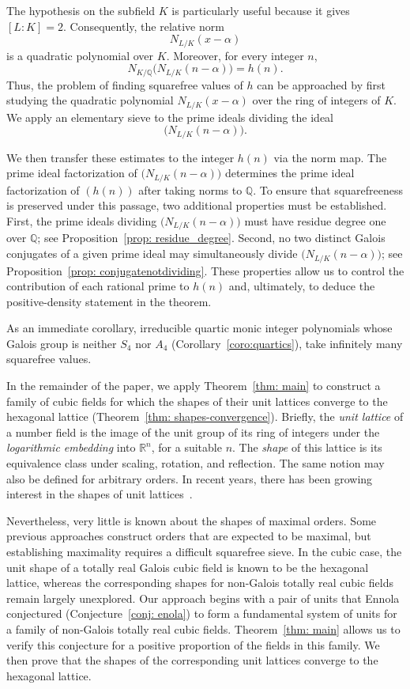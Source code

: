 \documentclass[11pt]{amsart}
\numberwithin{equation}{section}
\theoremstyle{definition}
\begin{document}
The hypothesis on the subfield $K$ is particularly useful because it gives $[L:K]=2$.
Consequently, the relative norm
\[
    N_{L/K}(x - \alpha)
\]
is a quadratic polynomial over $K$. Moreover, for every integer $n$,
\[
   N_{K/\mathbb{Q}}\bigl(N_{L/K}(n- \alpha)\bigr)=h(n).
\]
Thus, the problem of finding squarefree values of $h$ can be approached by first studying the quadratic polynomial $N_{L/K}(x-\alpha)$ over the ring of integers of $K$. We apply an elementary sieve to the prime ideals dividing the ideal
\[
   \bigl(N_{L/K}(n-\alpha)\bigr).
\]

We then transfer these estimates to the integer $h(n)$ via the norm map. The prime ideal factorization of $\bigl(N_{L/K}(n-\alpha)\bigr)$ determines the prime ideal factorization of $(h(n))$ after taking norms to $\mathbb{Q}$. To ensure that squarefreeness is preserved under this passage, two additional properties must be established. First, the prime ideals dividing $\bigl(N_{L/K}(n-\alpha)\bigr)$ must have residue degree one over $\mathbb{Q}$; see Proposition~\ref{prop: residue_degree}. Second, no two distinct Galois conjugates of a given prime ideal may simultaneously divide $\bigl(N_{L/K}(n-\alpha)\bigr)$; see Proposition~\ref{prop: conjugatenotdividing}. These properties allow us to control the contribution of each rational prime to $h(n)$ and, ultimately, to deduce the positive-density statement in the theorem.

As an immediate corollary, irreducible quartic monic integer polynomials whose Galois group is neither $S_4$ nor $A_4$ (Corollary~\ref{coro:quartics}), take infinitely many squarefree values.

In the remainder of the paper, we apply Theorem~\ref{thm: main} to construct a family of cubic fields for which the shapes of their unit lattices converge to the hexagonal lattice (Theorem~\ref{thm: shapes-convergence}). Briefly, the \emph{unit lattice} of a number field is the image of the unit group of its ring of integers under the \emph{logarithmic embedding} into $\mathbb{R}^n$, for a suitable $n$. The \emph{shape} of this lattice is its equivalence class under scaling, rotation, and reflection. The same notion may also be defined for arbitrary orders. In recent years, there has been growing interest in the shapes of unit lattices~\cite{D4unit,harron,cusick,dang,david, CorsoRodriguezHertz2025, cruz2025classificationtotallyrealnumber}. 

Nevertheless, very little is known about the shapes of maximal orders. Some previous approaches construct orders that are expected to be maximal, but establishing maximality requires a difficult squarefree sieve. In the cubic case, the unit shape of a totally real Galois cubic field is known to be the hexagonal lattice, whereas the corresponding shapes for non-Galois totally real cubic fields remain largely unexplored. Our approach begins with a pair of units that Ennola conjectured (Conjecture~\ref{conj: enola}) to form a fundamental system of units for a family of non-Galois totally real cubic fields. Theorem~\ref{thm: main} allows us to verify this conjecture for a positive proportion of the fields in this family. We then prove that the shapes of the corresponding unit lattices converge to the hexagonal lattice.
\end{document}
